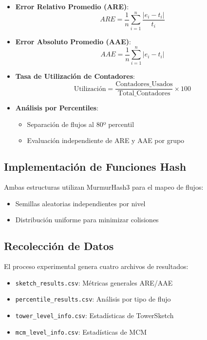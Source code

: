 \documentclass[a4paper,12pt]{article}
\begin{document}
\begin{itemize}
    \item \textbf{Error Relativo Promedio (ARE)}:
    \begin{equation}
        ARE = \frac{1}{n}\sum_{i=1}^{n}\frac{|e_i - t_i|}{t_i}
    \end{equation}
    
    \item \textbf{Error Absoluto Promedio (AAE)}:
    \begin{equation}
        AAE = \frac{1}{n}\sum_{i=1}^{n}|e_i - t_i|
    \end{equation}
    
    \item \textbf{Tasa de Utilización de Contadores}:
    \begin{equation}
        \text{Utilización} = \frac{\text{Contadores\_Usados}}{\text{Total\_Contadores}} \times 100
    \end{equation}
    
    \item \textbf{Análisis por Percentiles}:
    \begin{itemize}
        \item Separación de flujos al 80º percentil
        \item Evaluación independiente de ARE y AAE por grupo
    \end{itemize}
\end{itemize}

\subsection{Implementación de Funciones Hash}
Ambas estructuras utilizan MurmurHash3 para el mapeo de flujos:
\begin{itemize}
    \item Semillas aleatorias independientes por nivel
    \item Distribución uniforme para minimizar colisiones
\end{itemize}

\subsection{Recolección de Datos}
El proceso experimental genera cuatro archivos de resultados:

\begin{itemize}
    \item \texttt{sketch\_results.csv}: Métricas generales ARE/AAE
    \item \texttt{percentile\_results.csv}: Análisis por tipo de flujo
    \item \texttt{tower\_level\_info.csv}: Estadísticas de TowerSketch
    \item \texttt{mcm\_level\_info.csv}: Estadísticas de MCM
\end{itemize}
\end{document}
